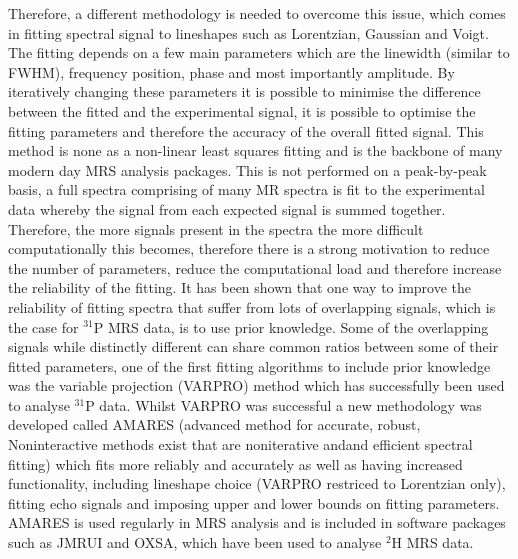 \documentclass[class=article, crop=false]{standalone}
\begin{document}
Therefore, a different methodology is needed to overcome this issue, which comes in fitting spectral signal to lineshapes such as Lorentzian\cite{Lorentz1895TheHeat}, Gaussian and Voigt\cite{Near2021PreprocessingRecommendations}. The fitting depends on a few main parameters which are the linewidth (similar to FWHM), frequency position, phase and most importantly amplitude. By iteratively changing these parameters it is possible to minimise the difference between the fitted and the experimental signal\cite{Vanhamme2001MRMethods}, it is possible to optimise the fitting parameters and therefore the accuracy of the overall fitted signal. This method is none as a non-linear least squares\cite{Golub1973TheSeparate} fitting and is the backbone of many modern day MRS analysis packages. This is not performed on a peak-by-peak basis, a full spectra comprising of many MR spectra is fit to the experimental data whereby the signal from each expected signal is summed together. Therefore, the more signals present in the spectra the more difficult computationally this becomes, therefore there is a strong motivation to reduce the number of parameters, reduce the computational load and therefore increase the reliability of the fitting\cite{Near2021PreprocessingRecommendations}. It has been shown that one way to improve the reliability of fitting spectra that suffer from lots of overlapping signals, which is the case for $^{31}$P MRS data, is to use prior knowledge\cite{Hamilton2003PriorSpectra}. Some of the overlapping signals while distinctly different can share common ratios between some of their fitted parameters, one of the first fitting algorithms to include prior knowledge was the variable projection (VARPRO) method\cite{Golub1973TheSeparate} which has successfully been used to analyse $^{31}$P data\cite{vanderVeen1988AccurateKnowledge,Stubbs199631P-MagneticADP}. Whilst VARPRO was successful a new methodology was developed called AMARES (advanced method for accurate, robust, Noninteractive methods exist that are noniterative andand efficient spectral fitting) which fits more reliably and accurately as well as having increased functionality, including lineshape choice (VARPRO restriced to Lorentzian only), fitting echo signals and imposing upper and lower bounds on fitting parameters\cite{Vanhamme1997ImprovedKnowledge}. AMARES is used regularly in MRS analysis and is included in software packages such as JMRUI\cite{Stefan2009QuantitationPackage} and OXSA\cite{Purvis2017OXSA:MATLAB}, which have been used to analyse $^2$H MRS data\cite{Simoes2022GlucoseGlioblastoma,Kreis2020MeasuringMRI,Kaggie2022DeuteriumMetabolism}. 
\end{document}
